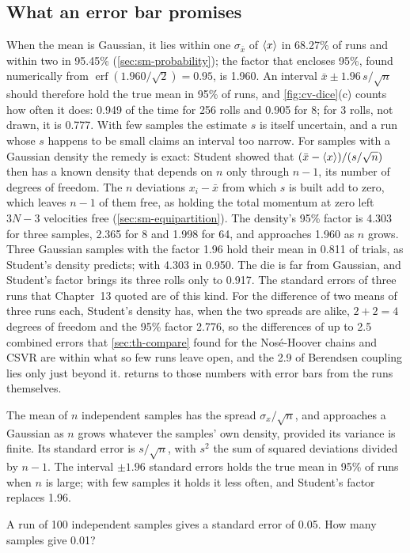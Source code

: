 \subsection*{What an error bar promises}

When the mean is Gaussian, it lies within one $\sigma_{\bar x}$ of
$\langle x \rangle$ in 68.27\% of runs and within two in 95.45\%
(\cref{sec:sm-probability}); the factor that encloses 95\%, found
numerically from $\operatorname{erf}(1.960/\sqrt2) = 0.95$, is 1.960. An interval $\bar x \pm
1.96\,s/\sqrt n$ should therefore hold the true mean in 95\% of runs, and
\cref{fig:cv-dice}(c) counts how often it does: 0.949 of the time for 256
rolls and 0.905 for 8; for 3 rolls, not drawn, it is 0.777. With few
samples the estimate $s$ is itself uncertain, and a run whose $s$ happens
to be small claims an interval too narrow. For samples with a Gaussian
density the remedy is exact: Student showed that $(\bar x - \langle x \rangle)/(s/
\sqrt n)$ then has a known density that depends on $n$ only through $n -
1$, its number of degrees of freedom. The $n$ deviations $x_i - \bar x$
from which $s$ is built add to zero, which leaves $n - 1$ of them free, as
holding the total momentum at zero left $3N - 3$ velocities free
(\cref{sec:sm-equipartition}). The density's 95\% factor is 4.303 for
three samples, 2.365 for 8 and 1.998 for 64, and approaches 1.960 as $n$
grows\cite{Student1908}. Three Gaussian samples with the factor 1.96
hold their mean in 0.811 of trials, as Student's density predicts; with
4.303 in 0.950. The die is far from Gaussian, and Student's factor brings
its three rolls only to 0.917. The standard errors of three runs that
Chapter~13 quoted are of this kind. For the difference of two means of
three runs each, Student's density has, when the two spreads are alike,
$2 + 2 = 4$ degrees of freedom and the 95\% factor 2.776, so the
differences of up to 2.5 combined errors that \cref{sec:th-compare} found
for the Nosé-Hoover chains and CSVR are within what so few runs leave open,
and the 2.9 of Berendsen coupling lies only just beyond it.
 returns to those numbers with error bars from
the runs themselves.

\begin{keyidea}
The mean of $n$ independent samples has the spread $\sigma_x/\sqrt n$, and
approaches a Gaussian as $n$ grows whatever the samples' own density,
provided its variance is finite. Its
standard error is $s/\sqrt n$, with $s^2$ the sum of squared deviations
divided by $n - 1$. The interval $\pm1.96$ standard errors holds the true
mean in 95\% of runs when $n$ is large; with few samples it holds it less
often, and Student's factor replaces 1.96.
\end{keyidea}


\begin{selfcheck}
A run of 100 independent samples gives a standard error of 0.05. How many
samples give 0.01?
\end{selfcheck}
